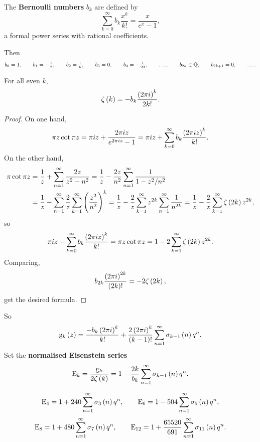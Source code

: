 \begin{definition}
The \textbf{Bernoulli numbers} $ b_k $ are defined by
$$ \sum_{k = 0}^\infty b_k\dfrac{x^k}{k!} = \dfrac{x}{e^x - 1}, $$
a formal power series with rational coefficients.
\end{definition}

Then
$$ b_0 = 1, \qquad b_1 = -\tfrac{1}{2}, \qquad b_2 = \tfrac{1}{6}, \qquad b_3 = 0, \qquad b_4 = -\tfrac{1}{20}, \qquad \dots, \qquad b_{2k} \in \mathbb{Q}, \qquad b_{2k + 1} = 0, \qquad \dots. $$

\pagebreak

\begin{proposition}
For all even $ k $,
$$ \zeta\br{k} = -b_k\dfrac{\br{2\pi i}^k}{2k!}. $$
\end{proposition}

\begin{proof}
On one hand,
$$ \pi z\cot \pi z = \pi iz + \dfrac{2\pi iz}{e^{2\pi iz} - 1} = \pi iz + \sum_{k = 0}^\infty b_k\dfrac{\br{2\pi iz}^k}{k!}. $$
On the other hand,
\begin{align*}
\pi\cot \pi z
& = \dfrac{1}{z} + \sum_{n = 1}^\infty \dfrac{2z}{z^2 - n^2}
= \dfrac{1}{z} - \dfrac{2z}{n^2}\sum_{n = 1}^\infty \dfrac{1}{1 - z^2 / n^2} \\
& = \dfrac{1}{z} - \sum_{n = 1}^\infty \dfrac{2}{z}\sum_{k = 1}^\infty \br{\dfrac{z^2}{n^2}}^k
= \dfrac{1}{z} - \dfrac{2}{z}\sum_{k = 1}^\infty z^{2k}\sum_{n = 1}^\infty \dfrac{1}{n^{2k}}
= \dfrac{1}{z} - \dfrac{2}{z}\sum_{k = 1}^\infty \zeta\br{2k}z^{2k},
\end{align*}
so
$$ \pi iz + \sum_{k = 0}^\infty b_k\dfrac{\br{2\pi iz}^k}{k!} = \pi z\cot \pi z = 1 - 2\sum_{k = 1}^\infty \zeta\br{2k}z^{2k}. $$
Comparing,
$$ b_{2k}\dfrac{\br{2\pi i}^{2k}}{\br{2k}!} = -2\zeta\br{2k}, $$
get the desired formula.
\end{proof}

So
$$ \g_k\br{z} = \dfrac{-b_k\br{2\pi i}^k}{k!} + \dfrac{2\br{2\pi i}^k}{\br{k - 1}!}\sum_{n = 1}^\infty \sigma_{k - 1}\br{n}q^n. $$
Set the \textbf{normalised Eisenstein series}
$$ \E_k = \dfrac{\g_k}{2\zeta\br{k}} = 1 - \dfrac{2k}{b_k}\sum_{n = 1}^\infty \sigma_{k - 1}\br{n}q^n. $$

\begin{example*}
$$ \E_4 = 1 + 240\sum_{n = 1}^\infty \sigma_3\br{n}q^n, \qquad \E_6 = 1 - 504\sum_{n = 1}^\infty \sigma_5\br{n}q^n, $$
$$ \E_8 = 1 + 480\sum_{n = 1}^\infty \sigma_7\br{n}q^n, \qquad \E_{12} = 1 + \dfrac{65520}{691}\sum_{n = 1}^\infty \sigma_{11}\br{n}q^n. $$
\end{example*}

